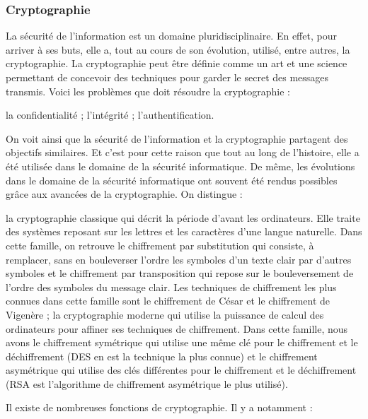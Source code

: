 \subsubsection{Cryptographie}
La sécurité de l'information est un domaine pluridisciplinaire. En effet, pour arriver à ses buts, elle a, tout au cours de son évolution, utilisé, entre autres, la cryptographie. La cryptographie peut être définie comme un art et une science permettant de concevoir des techniques pour garder le secret des messages transmis. Voici les problèmes que doit résoudre la cryptographie : 
\begin{itemize}
	\itemcheck la confidentialité ;
	\itemcheck l’intégrité ; 
	\itemcheck l’authentification.
\end{itemize}
On voit ainsi que la sécurité de l'information et la cryptographie partagent des objectifs similaires. Et c’est pour cette raison que tout au long de l’histoire, elle a été utilisée dans le domaine de la sécurité informatique. De même, les évolutions dans le domaine de la sécurité informatique ont souvent été rendus possibles grâce aux avancées de la cryptographie.
On distingue :
\begin{itemize}
	\itemtirait la cryptographie classique qui décrit la période d’avant les ordinateurs. Elle traite des systèmes reposant sur les lettres et les caractères d’une langue naturelle. Dans cette famille, on retrouve le chiffrement par substitution qui consiste, à remplacer, sans en bouleverser l’ordre les symboles d’un texte clair par d’autres symboles et le chiffrement par transposition qui repose sur le bouleversement de l’ordre des symboles du message clair. Les techniques de chiffrement les plus connues dans cette famille sont le chiffrement de César et le chiffrement de Vigenère ; 
	\itemtirait la cryptographie moderne qui utilise la puissance de calcul des ordinateurs pour affiner ses techniques de chiffrement. Dans cette famille, nous avons le chiffrement symétrique qui utilise une même clé pour le chiffrement et le déchiffrement (DES en est la technique la plus connue) et le chiffrement asymétrique qui utilise des clés différentes pour le chiffrement et le déchiffrement (RSA est l’algorithme de chiffrement asymétrique le plus utilisé).
\end{itemize}
Il existe de nombreuses fonctions de cryptographie. Il y a notamment :
